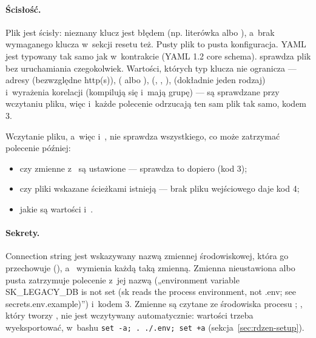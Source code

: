 \paragraph{Ścisłość.} Plik jest ścisły: nieznany klucz jest błędem (np. literówka
 albo ), a~brak wymaganego klucza w~sekcji resetu
też. Pusty plik to pusta konfiguracja. YAML jest typowany tak samo jak w~kontrakcie (YAML 1.2
core schema).  sprawdza plik bez uruchamiania czegokolwiek.
Wartości, których typ klucza nie ogranicza --- adresy (bezwzględne http(s)),
 ( albo ), 
(, , ),  (dokładnie jeden
rodzaj) i~wyrażenia korelacji (kompilują się i~mają grupę) --- są sprawdzane przy wczytaniu pliku, więc 
i~każde polecenie odrzucają ten sam plik tak samo, kodem 3.

Wczytanie pliku, a~więc i~, nie sprawdza wszystkiego,
co może zatrzymać polecenie później:
\begin{itemize}
  \item czy zmienne z~ są ustawione --- sprawdza to dopiero
         (kod 3);
  \item czy pliki wskazane ścieżkami istnieją --- brak pliku wejściowego daje kod 4;
  \item jakie są wartości  i~.
\end{itemize}

\paragraph{Sekrety.}  Connection string
jest wskazywany nazwą zmiennej środowiskowej, która go przechowuje
(), a~ wymienia każdą taką zmienną.
Zmienna nieustawiona albo pusta zatrzymuje polecenie z~jej nazwą („environment variable
SK\_LEGACY\_DB is not set (sk reads the process environment, not .env; see
secrets.env.example)”) i~kodem 3. Zmienne są czytane ze środowiska procesu ;
, który tworzy , nie jest wczytywany automatycznie:
wartości trzeba wyeksportować, w~bashu \texttt{set -a; . ./.env; set +a}
(sekcja~\ref{sec:rdzen-setup}).

